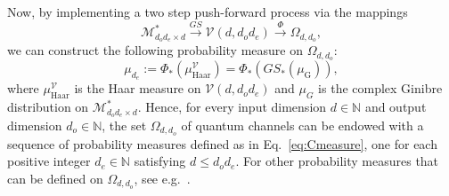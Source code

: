 \documentclass[a4paper,onecolumn,10pt,accepted=2022-07-11]{quantumarticle}
\newcommand{\gin}{\operatorname{G}}
\newcommand{\haar}{\operatorname{Haar}}
\theoremstyle{definition}
\begin{document}
Now, by implementing a two step push-forward process via the mappings
\begin{equation}
    \mathcal{M}^*_{d_od_e \times d} \xrightarrow{GS} \mathcal{V}(d,d_od_e) \xrightarrow{\Phi} \Omega_{d,d_o},
\end{equation}
we can construct the following probability measure on $\Omega_{d,d_o}$:
\begin{equation}\label{eq:Cmeasure}
\mu_{d_e} := \Phi_*(\mu^{\mathcal{V}}_{\haar}) = \Phi_*(GS_*(\mu_{\gin})),
\end{equation}
where $\mu^{\mathcal{V}}_{\haar}$ is the Haar measure on $\mathcal{V}(d,d_o d_e)$ and $\mu_G$ is the complex Ginibre distribution on $\mathcal{M}^*_{d_{o}d_{e} \times d}$.
Hence, for every input dimension $d\in\mathbb{N}$ and output dimension $d_o\in\mathbb{N}$, the set $\Omega_{d,d_o}$ of quantum channels can be endowed with a sequence of probability measures defined as in Eq.~\eqref{eq:Cmeasure}, one for each positive integer $d_e\in\mathbb{N}$ satisfying $d\leq d_od_e$. For other probability measures that can be defined on $\Omega_{d,d_o}$, see e.g.~\cite{kukulski2021generating}.
\end{document}
